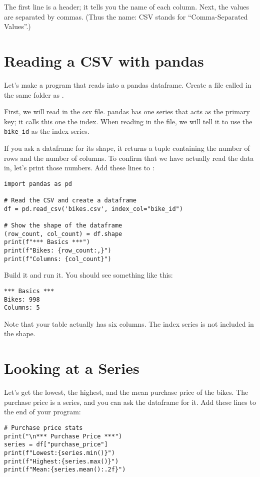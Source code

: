 The first line is a header; it tells you the name of each column.
Next, the values are separated by commas. (Thus the name: CSV stands
for ``Comma-Separated Values''.)

\section{Reading a CSV with pandas}

Let's make a program that reads  into a pandas
dataframe.  Create a file called  in the same
folder as .

First, we will read in the csv file. pandas has one series that acts
as the primary key; it calls this one the index. When reading in the
file, we will tell it to use the \texttt{bike\_id} as the index
series.

If you ask a dataframe for its shape, it returns a tuple containing
the number of rows and the number of columns. To confirm that we have
actually read the data in, let's print those numbers.  Add these lines
to :

\begin{Verbatim}
import pandas as pd

# Read the CSV and create a dataframe
df = pd.read_csv('bikes.csv', index_col="bike_id")

# Show the shape of the dataframe
(row_count, col_count) = df.shape
print(f"*** Basics ***")
print(f"Bikes: {row_count:,}")
print(f"Columns: {col_count}")
\end{Verbatim}

Build it and run it. You should see something like this:
\begin{Verbatim}
*** Basics ***
Bikes: 998
Columns: 5
\end{Verbatim}

Note that your table actually has six columns. The index series is
not included in the shape.

\section{Looking at a Series}

Let's get the lowest, the highest, and the mean purchase price of the
bikes.  The purchase price is a series, and you can ask the dataframe
for it. Add these lines to the end of your program:

\begin{Verbatim}
# Purchase price stats
print("\n*** Purchase Price ***")
series = df["purchase_price"]
print(f"Lowest:{series.min()}")
print(f"Highest:{series.max()}")
print(f"Mean:{series.mean():.2f}")
\end{Verbatim}

